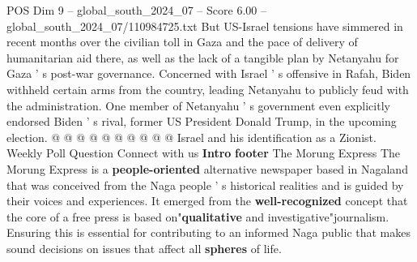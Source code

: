 \begin{textsample}{POS Dim 9 – global\_south\_2024\_07 – Score 6.00 – global\_south\_2024\_07/110984725.txt}
But US-Israel tensions have simmered in recent months over the civilian toll in Gaza and the pace of delivery of humanitarian aid there, as well as the lack of a tangible plan by Netanyahu for Gaza ' s post-war governance.
Concerned with Israel ' s offensive in Rafah, Biden withheld certain arms from the country, leading Netanyahu to publicly feud with the administration.
One member of Netanyahu ' s government even explicitly endorsed Biden ' s rival, former US President Donald Trump, in the upcoming election. @ @ @ @ @ @ @ @ @ @ Israel and his identification as a Zionist.
Weekly Poll Question Connect with us \textbf{Intro} \textbf{footer} The Morung Express The Morung Express is a \textbf{people-oriented} alternative newspaper based in Nagaland that was conceived from the Naga people ' s historical realities and is guided by their voices and experiences.
It emerged from the \textbf{well-recognized} concept that the core of a free press is based on"\textbf{qualitative} and investigative"journalism.
Ensuring this is essential for contributing to an informed Naga public that makes sound decisions on issues that affect all \textbf{spheres} of life.

\end{textsample}
